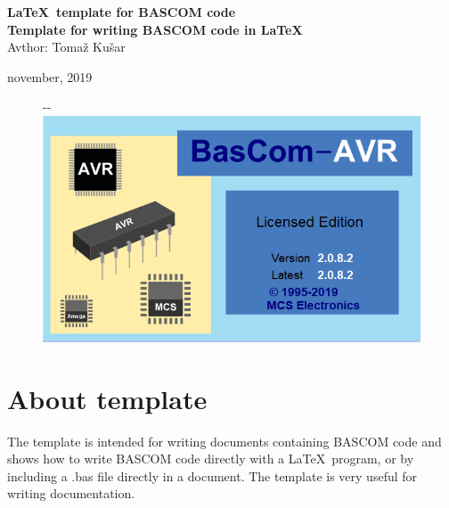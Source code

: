 \documentclass[10pt,a4paper]{article}
\begin{document}
\baselineskip 19pt \thispagestyle{empty}

\begin{center}
{\Huge\bf \LaTeX\ template for BASCOM code}\\
[1cm] {\large \bf Template for writing BASCOM code in \LaTeX\ }\\


Avthor: Tomaž Kušar

november, 2019\linebreak 
\begin{figure}[h!] %
\begin{adjustwidth}{-\oddsidemargin-1in}{-\rightmargin}
 \includegraphics[width=210mm]{./images/BASCOM_start.png}\\
\end{adjustwidth}
\end{figure}

\end{center}
\clearpage \setcounter{page}{2}
\newpage



\newpage
\pagestyle{fancy}
\renewcommand{\sectionmark}[1]{\markright{Template for BASCOM code }}
\renewcommand{\subsectionmark}[1]{\markright{Template for BASCOM code}}
\renewcommand{\subsubsectionmark}[1]{\markright{Template for BASCOM code}}


\section{About template}
The template is intended for writing documents containing BASCOM code and shows how to write BASCOM code directly with a \LaTeX\  program, or by including a .bas file directly in a document.  The template is very useful for writing documentation.
\end{document}
